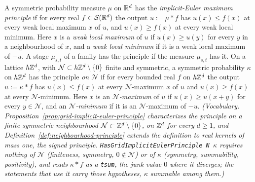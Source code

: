 \begin{definition}
\label{def:implicit-euler-principle}
\leanok
A symmetric probability measure $\mu$ on $\mathbb{R}^d$ has the \emph{implicit-Euler maximum principle}
if for every real $f \in \mathcal{S}(\mathbb{R}^d)$ the output $u := \mu * f$ has $u(x) \le f(x)$ at every
weak local maximum $x$ of $u$, and $u(x) \ge f(x)$ at every weak local minimum. Here $x$ is a
\emph{weak local maximum} of $u$ if $u(x) \ge u(y)$ for every $y$ in a neighbourhood of $x$, and a
\emph{weak local minimum} if it is a weak local maximum of $-u$. A stage $\mu_{s,t}$ of a
family has the principle if the measure $\mu_{s,t}$ has it. On a lattice $h\mathbb{Z}^d$, with
$\mathcal{N} \subset h\mathbb{Z}^d \setminus \{0\}$ finite and symmetric, a symmetric probability $\kappa$
on $h\mathbb{Z}^d$ has the principle \emph{on $\mathcal{N}$} if for every bounded real $f$ on $h\mathbb{Z}^d$ the
output $u := \kappa * f$ has $u(x) \le f(x)$ at every $\mathcal{N}$-maximum $x$ of $u$ and
$u(x) \ge f(x)$ at every $\mathcal{N}$-minimum. Here $x$ is an \emph{$\mathcal{N}$-maximum} of $u$ if
$u(x) \ge u(x + y)$ for every $y \in \mathcal{N}$, and an \emph{$\mathcal{N}$-minimum} if it is an
$\mathcal{N}$-maximum of $-u$.
\statusT\quad\emph{(Vocabulary. Proposition~\ref{prop:grid-implicit-euler-principle} characterizes
the principle on a finite symmetric neighbourhood $\mathcal{N} \subset \mathbb{Z}^d \setminus \{0\}$, on
$\mathbb{Z}^d$ for every $d \ge 1$, and Definition~\ref{def:neighbourhood-principle}
extends the definition to real kernels of mass one, the signed principle.
\texttt{HasGridImplicitEulerPrinciple N $\kappa$} requires nothing of $\mathcal{N}$ (finiteness, symmetry,
$0 \notin \mathcal{N}$) or of $\kappa$ (symmetry, summability, positivity), and reads $\kappa * f$ as
a \texttt{tsum}, the junk value $0$ where it diverges; the statements that use it carry those
hypotheses, $\kappa$ summable among them.)}
\end{definition}

